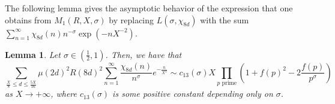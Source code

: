 \documentclass[10pt,a4paper]{amsart}
\theoremstyle{plain}
\newtheorem{lemma}[theorem]{Lemma}
\theoremstyle{definition}
\theoremstyle{remark}
\begin{document}
The following lemma gives the asymptotic behavior of the expression that one obtains from $M_1(R,X,\sigma)$ by replacing $L(\sigma,\chi_{8d})$ with the sum $\sum_{n=1}^{\infty}\chi_{8d}(n)n^{-\sigma}\exp(-n X^{-2})$.

\begin{lemma}\label{M1 approximation}
Let $\sigma \in \left( \frac{1}{2},1 \right)$. Then, we have that
\begin{equation}\label{eq M1 approx}
\sum_{\frac{X}{8}\leq d\leq \frac{5X}{16}}\mu(2d)^2R(8d)^2\sum_{n=1}^{\infty}\frac{\chi_{8d}(n)}{n^\sigma} e^{-\frac{n}{X^2}} \sim c_{13}(\sigma) X\prod_{p\text{ prime}}\left(1+f(p)^2-2\frac{f(p)}{p^{\sigma}}\right)   
\end{equation}
as $X \to +\infty$, where $c_{13}(\sigma)$ is some positive constant depending only on $\sigma$.
\end{lemma}
\end{document}
